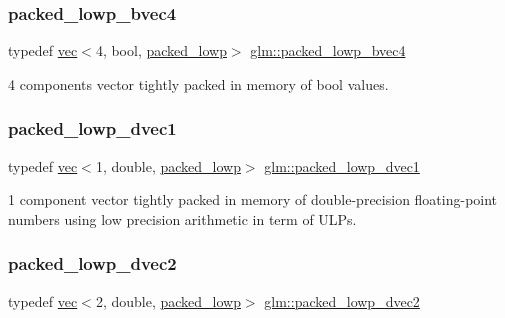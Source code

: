 \subsubsection{\texorpdfstring{packed\+\_\+lowp\+\_\+bvec4}{packed\_lowp\_bvec4}}
{\footnotesize\ttfamily typedef \hyperlink{structglm_1_1vec}{vec}$<$4, bool, \hyperlink{namespaceglm_a36ed105b07c7746804d7fdc7cc90ff25ac36a4bd74559be2c0b65bc48e5953b8b}{packed\+\_\+lowp}$>$ \hyperlink{group__gtc__type__aligned_ga7340a9bf8a974a263c6eaef48133331c}{glm\+::packed\+\_\+lowp\+\_\+bvec4}}



4 components vector tightly packed in memory of bool values. 

\mbox{\label{group__gtc__type__aligned_gab43886895b98688f4ebbc395e5a633ff}} 
\subsubsection{\texorpdfstring{packed\+\_\+lowp\+\_\+dvec1}{packed\_lowp\_dvec1}}
{\footnotesize\ttfamily typedef \hyperlink{structglm_1_1vec}{vec}$<$1, double, \hyperlink{namespaceglm_a36ed105b07c7746804d7fdc7cc90ff25ac36a4bd74559be2c0b65bc48e5953b8b}{packed\+\_\+lowp}$>$ \hyperlink{group__gtc__type__aligned_gab43886895b98688f4ebbc395e5a633ff}{glm\+::packed\+\_\+lowp\+\_\+dvec1}}



1 component vector tightly packed in memory of double-\/precision floating-\/point numbers using low precision arithmetic in term of U\+L\+Ps. 

\mbox{\label{group__gtc__type__aligned_gae61fd7d54de0db35af2b3b7fde2971f2}} 
\subsubsection{\texorpdfstring{packed\+\_\+lowp\+\_\+dvec2}{packed\_lowp\_dvec2}}
{\footnotesize\ttfamily typedef \hyperlink{structglm_1_1vec}{vec}$<$2, double, \hyperlink{namespaceglm_a36ed105b07c7746804d7fdc7cc90ff25ac36a4bd74559be2c0b65bc48e5953b8b}{packed\+\_\+lowp}$>$ \hyperlink{group__gtc__type__aligned_gae61fd7d54de0db35af2b3b7fde2971f2}{glm\+::packed\+\_\+lowp\+\_\+dvec2}}



